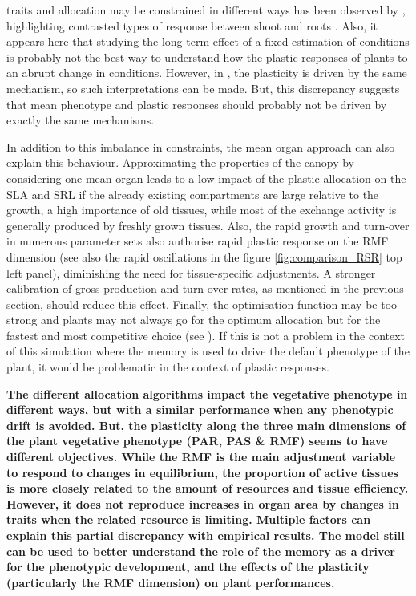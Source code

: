 traits and allocation may be constrained in different ways has been observed by \cite{freschet_integrated_2015}, highlighting contrasted types of response between shoot and roots \parencite{poorter_limits_2015}. Also, it appears here that studying the long-term effect of a fixed estimation of conditions is probably not the best way to understand how the plastic responses of plants to an abrupt change in conditions. However, in \model , the plasticity is driven by the same mechanism, so such interpretations can be made. But, this discrepancy suggests that mean phenotype and plastic responses should probably not be driven by exactly the same mechanisms.

In addition to this imbalance in constraints, the mean organ approach can also explain this behaviour. Approximating the properties of the canopy by considering one mean organ leads to a low impact of the plastic allocation on the SLA and SRL if the already existing compartments are large relative to the growth, a high importance of old tissues, while most of the exchange activity is generally produced by freshly grown tissues. Also, the rapid growth and turn-over in numerous parameter sets also authorise rapid plastic response on the RMF dimension (see also the rapid oscillations in the figure \ref{fig:comparison_RSR} top left panel), diminishing the need for tissue-specific adjustments. A stronger calibration of gross production and turn-over rates, as mentioned in the previous section, should reduce this effect. Finally, the optimisation function may be too strong and plants may not always go for the optimum allocation but for the fastest and most competitive choice (see \cite{farrior_resource_2011,dybzinski_evolutionarily_2011, farrior_competitive_2014}). If this is not a problem in the context of this simulation where the memory is used to drive the default phenotype of the plant, it would be problematic in the context of plastic responses.


\textbf{The different allocation algorithms impact the vegetative phenotype in different ways, but with a similar performance when any phenotypic drift is avoided. But, the plasticity along the three main dimensions of the plant vegetative phenotype (PAR, PAS \& RMF) seems to have different objectives. While the RMF is the main adjustment variable to respond to changes in equilibrium, the proportion of active tissues is more closely related to the amount of resources and tissue efficiency.  However, it does not reproduce increases in organ area by changes in traits when the related resource is limiting. Multiple factors can explain this partial discrepancy with empirical results. The model still can be used to better understand the role of the memory as a driver for the phenotypic development, and the effects of the plasticity (particularly the RMF dimension) on plant performances.}

